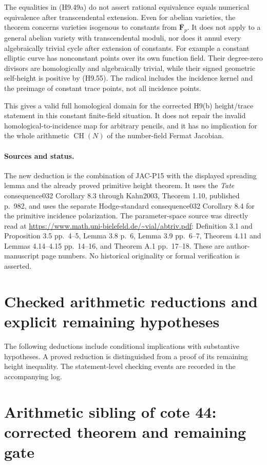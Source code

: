 \documentclass[11pt,a4paper]{article}
\begin{document}
The equalities in (H9.49a) do not assert rational equivalence equals
numerical equivalence after transcendental extension. Even for
abelian varieties, the theorem concerns varieties isogenous
to constants from $\overline{\mathbf F}_p$. It does not apply to a
general abelian variety with transcendental moduli, nor does it
annul every algebraically trivial cycle after extension of constants.
For example a constant elliptic curve has nonconstant points over
its own function field. Their degree-zero divisors are homologically
and algebraically trivial, while their signed geometric self-height
is positive by (H9.55). The radical includes the incidence kernel
and the preimage of constant trace points, not all incidence points.

This gives a valid full homological domain for the corrected H9(b)
height/trace statement in this constant finite-field situation. It
does not repair the invalid homological-to-incidence map for arbitrary
pencils, and it has no implication for the whole arithmetic
$\operatorname{CH}(N)$ of the number-field Fermat Jacobian.

\paragraph{Sources and status.}
The new deduction is the combination of JAC-P15 with the displayed
spreading lemma and the already proved primitive height theorem.
It uses the \emph{Tate} consequence032 Corollary 8.3 through
Kahn2003, Theorem 1.10, published p.~982, and uses the separate
Hodge-standard consequence032 Corollary 8.4 for the primitive
incidence polarization. The parameter-space source was directly read
at \url{https://www.math.uni-bielefeld.de/~vial/abtriv.pdf}:
Definition 3.1 and Proposition 3.5 pp.~4--5, Lemma 3.8 p.~6,
Lemma 3.9 pp.~6--7, Theorem 4.11 and Lemmas 4.14--4.15 pp.~14--16,
and Theorem A.1 pp.~17--18. These are author-manuscript page numbers.
No historical originality or formal verification is asserted.
\section{Checked arithmetic reductions and explicit remaining hypotheses}
The following deductions include conditional implications with substantive
hypotheses. A proved reduction is distinguished from a proof of its
remaining height inequality. The statement-level checking events are
recorded in the accompanying log.
\section{Arithmetic sibling of cote 44: corrected theorem and remaining
gate}\label{arithmetic-sibling-of-cote-44-corrected-theorem-and-remaining-gate}
\end{document}
